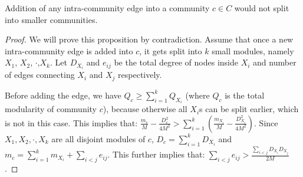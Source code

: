 \begin{prop}\label{2}
Addition of any intra-community edge into a community $c\in C$ would not split into smaller communities.
\end{prop}




\begin{proof}
We will prove this proposition by contradiction.
Assume that once a new intra-community edge is added into $c$, it gets split into $k$ small modules, namely $X_1$, $X_2$, $\cdot$,$X_k$. Let $D_{X_i}$ and $e_{ij}$ be the total degree of nodes inside $X_i$ and number of edges connecting $X_i$ and $X_j$ respectively. 


Before adding the edge, we have $Q_c \geq \sum_{i=1}^k Q_{X_i}$ (where $Q_c$ is the total modularity of community $c$), because otherwise all $X_i$s can be split earlier, which is not in this case. This implies that: $\frac{m_c}{M}- \frac{D_c^2}{4M^2} > \sum_{i=1}^k (\frac{m_{X_i}}{M} - \frac{D_{X_i}^2}{4M^2})$. Since $X_1,X_2,\cdot,X_k$ are all disjoint modules of $c$, $D_c=\sum_{i=1}^k D_{X_i}$ and $m_c=\sum_{i=1}^k m_{X_i} + \sum_{i<j} e_{ij}$. This further implies that:
$\sum_{i<j} e_{ij} > \frac{\sum_{i<j} D_{X_i}D_{X_j}}{2M}
$.
 

\end{proof}
